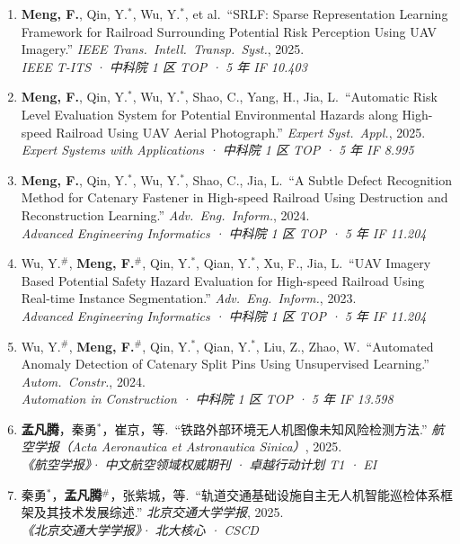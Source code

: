 \documentclass[10.5pt,a4paper]{ctexart}
\begin{document}
\vspace{0.4em}
\begin{enumerate}[leftmargin=1.7em,itemsep=3.5pt,topsep=1pt,labelsep=0.5em]
  \item \textbf{Meng, F.}, Qin, Y.$^*$, Wu, Y.$^*$, et al.\ ``SRLF: Sparse Representation Learning Framework for Railroad Surrounding Potential Risk Perception Using UAV Imagery.'' \textit{IEEE Trans.\ Intell.\ Transp.\ Syst.}, 2025.\\
    {\footnotesize\itshape\color{muted}IEEE T-ITS · 中科院 1 区 TOP · 5 年 IF 10.403}

  \item \textbf{Meng, F.}, Qin, Y.$^*$, Wu, Y.$^*$, Shao, C., Yang, H., Jia, L.\ ``Automatic Risk Level Evaluation System for Potential Environmental Hazards along High-speed Railroad Using UAV Aerial Photograph.'' \textit{Expert Syst.\ Appl.}, 2025.\\
    {\footnotesize\itshape\color{muted}Expert Systems with Applications · 中科院 1 区 TOP · 5 年 IF 8.995}

  \item \textbf{Meng, F.}, Qin, Y.$^*$, Wu, Y.$^*$, Shao, C., Jia, L.\ ``A Subtle Defect Recognition Method for Catenary Fastener in High-speed Railroad Using Destruction and Reconstruction Learning.'' \textit{Adv.\ Eng.\ Inform.}, 2024.\\
    {\footnotesize\itshape\color{muted}Advanced Engineering Informatics · 中科院 1 区 TOP · 5 年 IF 11.204}

  \item Wu, Y.$^\#$, \textbf{Meng, F.}$^\#$, Qin, Y.$^*$, Qian, Y.$^*$, Xu, F., Jia, L.\ ``UAV Imagery Based Potential Safety Hazard Evaluation for High-speed Railroad Using Real-time Instance Segmentation.'' \textit{Adv.\ Eng.\ Inform.}, 2023.\\
    {\footnotesize\itshape\color{muted}Advanced Engineering Informatics · 中科院 1 区 TOP · 5 年 IF 11.204}

  \item Wu, Y.$^\#$, \textbf{Meng, F.}$^\#$, Qin, Y.$^*$, Qian, Y.$^*$, Liu, Z., Zhao, W.\ ``Automated Anomaly Detection of Catenary Split Pins Using Unsupervised Learning.'' \textit{Autom.\ Constr.}, 2024.\\
    {\footnotesize\itshape\color{muted}Automation in Construction · 中科院 1 区 TOP · 5 年 IF 13.598}

  \item \textbf{孟凡腾}，秦勇$^{*}$，崔京，等.\ ``铁路外部环境无人机图像未知风险检测方法.'' \textit{航空学报（Acta Aeronautica et Astronautica Sinica）}, 2025.\\
    {\footnotesize\itshape\color{muted}《航空学报》· 中文航空领域权威期刊 · 卓越行动计划 T1 · EI}

  \item 秦勇$^{*}$，\textbf{孟凡腾}$^{\#}$，张紫城，等.\ ``轨道交通基础设施自主无人机智能巡检体系框架及其技术发展综述.'' \textit{北京交通大学学报}, 2025.\\
    {\footnotesize\itshape\color{muted}《北京交通大学学报》· 北大核心 · CSCD}
\end{enumerate}
\end{document}
